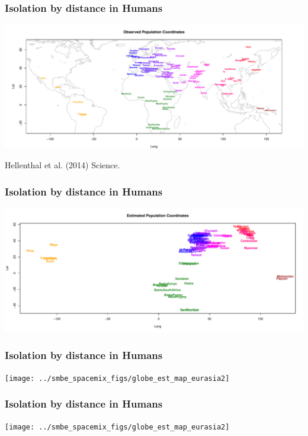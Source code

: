 \documentclass{beamer}
\begin{document}
\begin{frame}
\frametitle{Isolation by distance in Humans}
	\begin{center} \includegraphics[width=
           \textwidth]{../smbe_spacemix_figs/globe_obs_map_option2}
 \end{center}
     {\tiny Hellenthal et al. (2014) Science.}  
\end{frame}

\begin{frame}
\frametitle{Isolation by distance in Humans}
	\begin{center} \includegraphics[width=
           \textwidth]{../smbe_spacemix_figs/globe_est_map}
 \end{center}
\end{frame}

\begin{frame}
\frametitle{Isolation by distance in Humans}
	\begin{center} \texttt{[image: ../smbe\_spacemix\_figs/globe\_est\_map\_eurasia2]}
 \end{center}
\end{frame}

\begin{frame}
\frametitle{Isolation by distance in Humans}
	\begin{center} \texttt{[image: ../smbe\_spacemix\_figs/globe\_est\_map\_eurasia2]}
 \end{center}
\end{frame}
\end{document}

